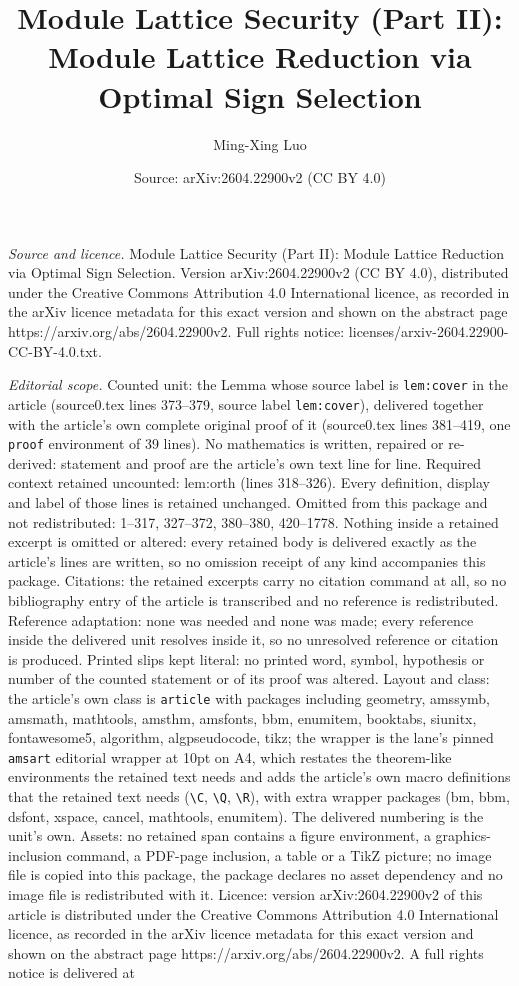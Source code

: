 \documentclass[10pt,a4paper]{amsart}
\title[Module Lattice Security (Part II): Module Lattice Reduction ]{Module Lattice Security (Part II): Module Lattice Reduction via Optimal Sign Selection}
\author{Ming-Xing Luo}
\date{Source: arXiv:2604.22900v2 (CC BY 4.0)}
\begin{document}
\maketitle

\noindent\emph{Source and licence.} Module Lattice Security (Part II): Module Lattice Reduction via Optimal Sign Selection. Version arXiv:2604.22900v2 (CC BY 4.0), distributed under the Creative Commons Attribution 4.0 International licence, as recorded in the arXiv licence metadata for this exact version and shown on the abstract page https://arxiv.org/abs/2604.22900v2. Full rights notice: licenses/arxiv-2604.22900-CC-BY-4.0.txt.\par\smallskip

\noindent\textit{Editorial scope.} Counted unit: the Lemma whose source label is \texttt{lem:cover} in the article (source0.tex lines 373--379, source label \texttt{lem:cover}), delivered together with the article's own complete original proof of it (source0.tex lines 381--419, one \texttt{proof} environment of 39 lines). No mathematics is written, repaired or re-derived: statement and proof are the article's own text line for line. Required context retained uncounted: lem:orth (lines 318--326). Every definition, display and label of those lines is retained unchanged. Omitted from this package and not redistributed: 1--317, 327--372, 380--380, 420--1778. Nothing inside a retained excerpt is omitted or altered: every retained body is delivered exactly as the article's lines are written, so no omission receipt of any kind accompanies this package. Citations: the retained excerpts carry no citation command at all, so no bibliography entry of the article is transcribed and no reference is redistributed. Reference adaptation: none was needed and none was made; every reference inside the delivered unit resolves inside it, so no unresolved reference or citation is produced. Printed slips kept literal: no printed word, symbol, hypothesis or number of the counted statement or of its proof was altered. Layout and class: the article's own class is \texttt{article} with packages including geometry, amssymb, amsmath, mathtools, amsthm, amsfonts, bbm, enumitem, booktabs, siunitx, fontawesome5, algorithm, algpseudocode, tikz; the wrapper is the lane's pinned \texttt{amsart} editorial wrapper at 10pt on A4, which restates the theorem-like environments the retained text needs and adds the article's own macro definitions that the retained text needs (\texttt{\textbackslash C}, \texttt{\textbackslash Q}, \texttt{\textbackslash R}), with extra wrapper packages (bm, bbm, dsfont, xspace, cancel, mathtools, enumitem). The delivered numbering is the unit's own. Assets: no retained span contains a figure environment, a graphics-inclusion command, a PDF-page inclusion, a table or a TikZ picture; no image file is copied into this package, the package declares no asset dependency and no image file is redistributed with it. Licence: version arXiv:2604.22900v2 of this article is distributed under the Creative Commons Attribution 4.0 International licence, as recorded in the arXiv licence metadata for this exact version and shown on the abstract page https://arxiv.org/abs/2604.22900v2. A full rights notice is delivered at 
\end{document}
